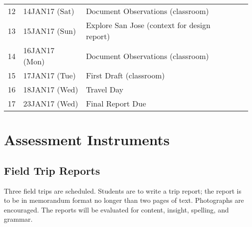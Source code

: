 \documentclass[12pt]{article}
\begin{document}
\begin{longtable}{p{0.2in}p{1.2in}p{3.7in}p{1.0in}}
\hline
\hline
12 & 14JAN17 (Sat) & Document Observations (classroom) &  \\
13 & 15JAN17 (Sun) & Explore San Jose (context for design report) &  \\
\hline
\hline
14 & 16JAN17 (Mon) & Document Observations (classroom) &   \\
15 & 17JAN17 (Tue) & First Draft (classroom) &  \\
16 & 18JAN17 (Wed) & Travel Day &  \\
\hline
17 & 23JAN17 (Wed) & Final Report Due &  \\
\hline
\hline
\end{longtable}
\normalsize

%
\clearpage
\section*{Assessment Instruments}
\subsection*{Field Trip Reports}
Three field trips are scheduled.   Students are to write a trip report;  the report is to be in memorandum format no longer than two pages of text.  Photographs are encouraged.   The reports will be evaluated for content, insight, spelling, and grammar.     
\end{document}
